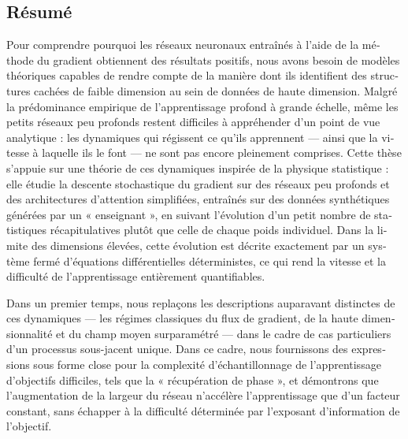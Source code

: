 \begin{otherlanguage}{french}
\chapter*{Résumé}

\begin{noparskip}

Pour comprendre pourquoi les réseaux neuronaux entraînés à l’aide de la méthode du gradient obtiennent des résultats positifs, nous avons besoin de modèles théoriques capables de rendre compte de la manière dont ils identifient des structures cachées de faible dimension au sein de données de haute dimension. Malgré la prédominance empirique de l’apprentissage profond à grande échelle, même les petits réseaux peu profonds restent difficiles à appréhender d’un point de vue analytique : les dynamiques qui régissent ce qu’ils apprennent — ainsi que la vitesse à laquelle ils le font — ne sont pas encore pleinement comprises.
Cette thèse s’appuie sur une théorie de ces dynamiques inspirée de la physique statistique : elle étudie la descente stochastique du gradient sur des réseaux peu profonds et des architectures d’attention simplifiées, entraînés sur des données synthétiques générées par un « enseignant », en suivant l’évolution d’un petit nombre de statistiques récapitulatives plutôt que celle de chaque poids individuel.
Dans la limite des dimensions élevées, cette évolution est décrite exactement par un système fermé d’équations différentielles déterministes, ce qui rend la vitesse et la difficulté de l’apprentissage entièrement quantifiables.

Dans un premier temps, nous replaçons les descriptions auparavant distinctes de ces dynamiques — les régimes classiques du flux de gradient, de la haute dimensionnalité et du champ moyen surparamétré — dans le cadre de cas particuliers d’un processus sous-jacent unique. Dans ce cadre, nous fournissons des expressions sous forme close pour la complexité d’échantillonnage de l’apprentissage d’objectifs difficiles, tels que la « récupération de phase », et démontrons que l’augmentation de la largeur du réseau n’accélère l’apprentissage que d’un facteur constant, sans échapper à la difficulté déterminée par l’exposant d’information de l’objectif.


\end{noparskip}
\end{otherlanguage}
